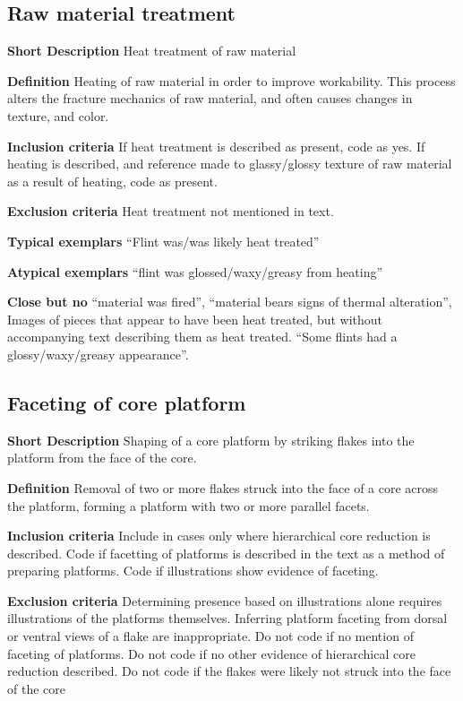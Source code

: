 \documentclass[
]{article}
\begin{document}
\hypertarget{raw-material-treatment}{%
\subsection{Raw material treatment}\label{raw-material-treatment}}

\textbf{Short Description} Heat treatment of raw material

\textbf{Definition} Heating of raw material in order to improve
workability. This process alters the fracture mechanics of raw material,
and often causes changes in texture, and color.

\textbf{Inclusion criteria} If heat treatment is described as present,
code as yes. If heating is described, and reference made to
glassy/glossy texture of raw material as a result of heating, code as
present.

\textbf{Exclusion criteria} Heat treatment not mentioned in text.

\textbf{Typical exemplars} ``Flint was/was likely heat treated''

\textbf{Atypical exemplars} ``flint was glossed/waxy/greasy from
heating''

\textbf{Close but no} ``material was fired'', ``material bears signs of
thermal alteration'', Images of pieces that appear to have been heat
treated, but without accompanying text describing them as heat treated.
``Some flints had a glossy/waxy/greasy appearance''.

\hypertarget{faceting-of-core-platform}{%
\subsection{Faceting of core platform}\label{faceting-of-core-platform}}

\textbf{Short Description} Shaping of a core platform by striking flakes
into the platform from the face of the core.

\textbf{Definition} Removal of two or more flakes struck into the face
of a core across the platform, forming a platform with two or more
parallel facets.

\textbf{Inclusion criteria} Include in cases only where hierarchical
core reduction is described. Code if facetting of platforms is described
in the text as a method of preparing platforms. Code if illustrations
show evidence of faceting.

\textbf{Exclusion criteria} Determining presence based on illustrations
alone requires illustrations of the platforms themselves. Inferring
platform faceting from dorsal or ventral views of a flake are
inappropriate. Do not code if no mention of faceting of platforms. Do
not code if no other evidence of hierarchical core reduction described.
Do not code if the flakes were likely not struck into the face of the
core
\end{document}
